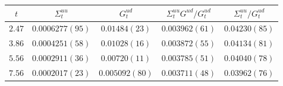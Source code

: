 \topinsert
{}
\vspace{-0.6em}
\begin{center}
\renewcommand{\arraystretch}{1.25}
\begin{tabular}{ccccc}
\hline\hline
$t$ & $\Sigma^{uu}_t$ & $G^{ud}_t$
    & $\Sigma^{uu}_tG^{ud}/G^{ud}_t$ & $\Sigma^{uu}_t/G^{ud}_t$ \\
\hline
$2.47$ & $0.0006277(95)$ & $0.01484(23)$  & $0.003962(61)$ & $0.04230(85)$ \\
$3.86$ & $0.0004251(58)$ & $0.01028(16)$  & $0.003872(55)$ & $0.04134(81)$ \\
$5.56$ & $0.0002911(36)$ & $0.00720(11)$  & $0.003785(51)$ & $0.04040(78)$ \\
$7.56$ & $0.0002017(23)$ & $0.005092(80)$ & $0.003711(48)$ & $0.03962(76)$ \\
\hline\hline
\end{tabular}
\end{center}
\endinsert
